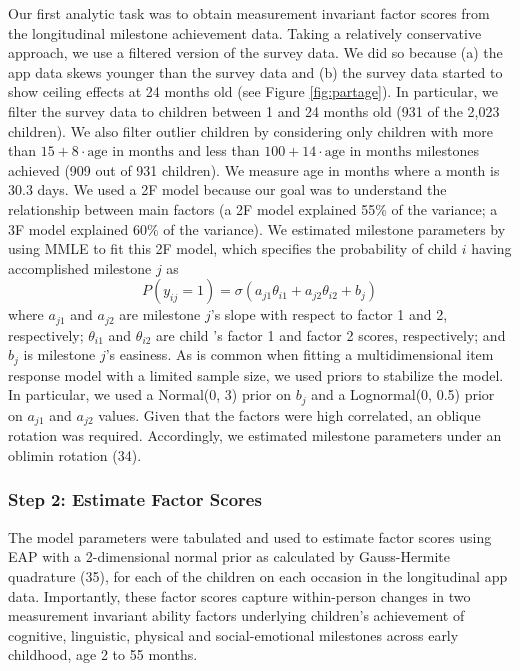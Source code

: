 \documentclass[man]{apa7}
\begin{document}
Our first analytic task was to obtain measurement invariant factor
scores from the longitudinal milestone achievement data. Taking a
relatively conservative approach, we use a filtered version of the
survey data. We did so because (a) the app data skews younger than the
survey data and (b) the survey data started to show ceiling effects at
24 months old (see Figure \ref{fig:partage}). In particular, we filter
the survey data to children between 1 and 24 months old (931 of the
2,023 children). We also filter outlier children by considering only
children with more than \(15 + 8 \cdot \text{age in months}\) and less
than \(100 + 14 \cdot \text{age in months}\) milestones achieved (909
out of 931 children). We measure age in months where a month is 30.3
days. We used a 2F model because our goal was to understand the
relationship between main factors (a 2F model explained 55\% of the
variance; a 3F model explained 60\% of the variance). We estimated
milestone parameters by using MMLE to fit this 2F model, which specifies
the probability of child \(i\) having accomplished milestone \(j\) as
\begin{equation}
P(y_{ij} = 1) = \sigma(a_{j1}\theta_{i1} + a_{j2}\theta_{i2} + b_j)
\end{equation} where \(a_{j1}\) and \(a_{j2}\) are milestone \(j\)'s
slope with respect to factor 1 and 2, respectively; \(\theta_{i1}\) and
\(\theta_{i2}\) are child 's factor 1 and factor 2 scores, respectively;
and \(b_j\) is milestone \(j\)'s easiness. As is common when fitting a
multidimensional item response model with a limited sample size, we used
priors to stabilize the model. In particular, we used a Normal(0, 3)
prior on \(b_j\) and a Lognormal(0, 0.5) prior on \(a_{j1}\) and
\(a_{j2}\) values. Given that the factors were high correlated, an
oblique rotation was required. Accordingly, we estimated milestone
parameters under an oblimin rotation (34).

\hypertarget{step-2-estimate-factor-scores}{%
\subsubsection*{Step 2: Estimate Factor
Scores}\label{step-2-estimate-factor-scores}}

The model parameters were tabulated and used to estimate factor scores
using EAP with a 2-dimensional normal prior as calculated by
Gauss-Hermite quadrature (35), for each of the children on each occasion
in the longitudinal app data. Importantly, these factor scores capture
within-person changes in two measurement invariant ability factors
underlying children's achievement of cognitive, linguistic, physical and
social-emotional milestones across early childhood, age 2 to 55 months.
\end{document}
